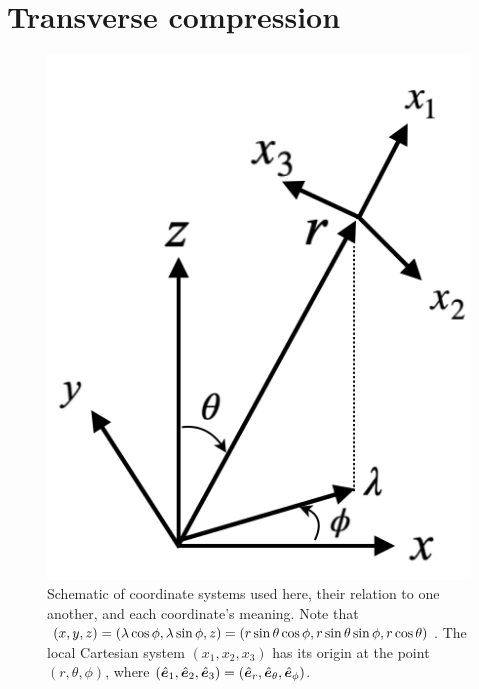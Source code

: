 \documentclass[12pt]{article}
\begin{document}
\section{Transverse compression}
  \begin{figure}
	\includegraphics[scale=0.6]{Fig1_coordinate_systems.png}
	\caption{Schematic of coordinate systems used here, their relation to one another, and each coordinate's meaning. Note that $(x,y,z) = (\lambda\cos\phi, \lambda\sin\phi, z) = (r\sin\theta\cos\phi, r\sin\theta\sin\phi, r\cos\theta)$. The local Cartesian system $(x_1,x_2,x_3)$ has its origin at the point $(r,\theta,\phi)$, where $(\hat{\bm{e}}_1,\hat{\bm{e}}_2,\hat{\bm{e}}_3) = (\hat{\bm{e}}_r, \hat{\bm{e}}_\theta, \hat{\bm{e}}_\phi)$. }
	\label{fig:coords}
\end{figure}
\end{document}
